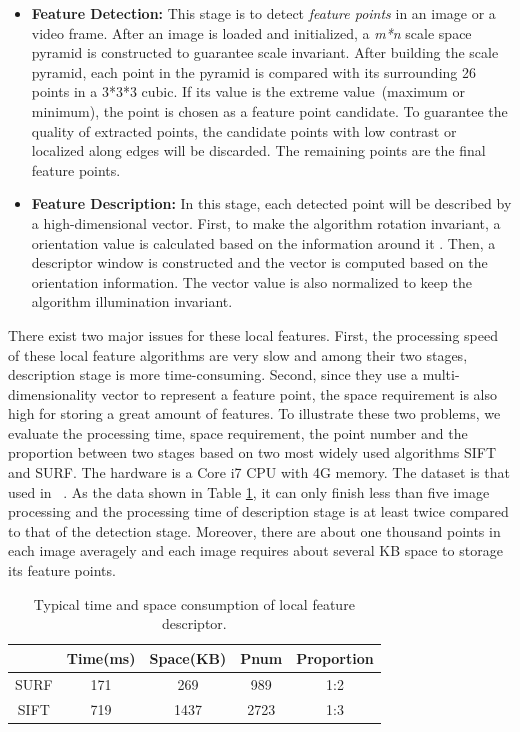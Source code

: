 \begin{itemize}
\setlength{\itemsep}{0mm}

\item \textbf{Feature Detection:} This stage is to detect \emph{feature points} in an image or a video frame. After an image is loaded and initialized, a \emph{m*n} scale space pyramid is constructed to guarantee scale invariant.  After building the scale pyramid, each point in the pyramid is compared with its surrounding 26 points in a 3*3*3 cubic. If its value is the extreme value~(maximum or minimum), the point is chosen as a feature point candidate. To guarantee the quality of extracted points, the candidate points with low contrast or localized along edges will be discarded. The remaining points are the final feature points.

\item \textbf{Feature Description:} In this stage, each detected point will be described by a high-dimensional vector. First, to make the algorithm rotation invariant, a orientation value is calculated based on the information around it . Then, a descriptor window is constructed and the vector is computed based on the orientation information. The vector value is also normalized to keep the algorithm illumination invariant.
\end{itemize}

There exist two major issues for these local features. First, the processing speed of these local feature algorithms are very slow and among their two stages, description stage is more time-consuming. Second, since they use a multi-dimensionality vector to represent a feature point, the space requirement is also high for storing a great amount of features. To illustrate these two problems, we evaluate the processing time, space requirement, the point number and the proportion between two stages based on two most widely used algorithms SIFT and SURF. The hardware is a Core i7 CPU with 4G memory. The dataset is that used in ~\cite{mikolajczyk2005performance}. As the data shown in Table \ref{tab:surfandsift}, it can only finish less than five image processing and the processing time of description stage is at least twice compared to that of the detection stage. Moreover, there are about one thousand points in each image averagely and each image requires about several KB space to storage its feature points.

\begin{table}[!t]
\begin{center}
\begin{tabular}{|c|c|c|c|c|}
\hline
 & Time(ms) & Space(KB) & Pnum & Proportion \\
\hline\hline
SURF & 171 & 269 & 989   &  1:2\\\hline
SIFT & 719 & 1437 & 2723 & 1:3 \\\hline
\end{tabular}
\end{center}
\caption{Typical time and space consumption of local feature descriptor.}
\label{tab:surfandsift}
\end{table}

